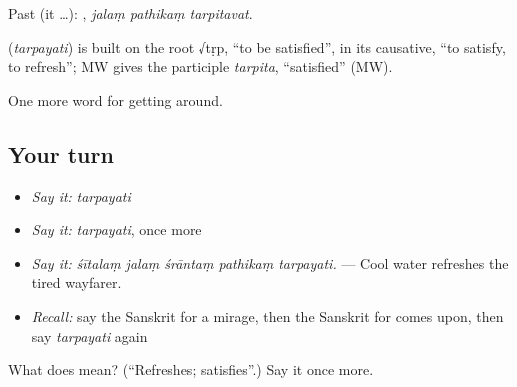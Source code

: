 Past (it …):   , \emph{jalaṃ pathikaṃ tarpitavat}.

\begin{cousinweb}
\textbf{} (\emph{tarpayati}) is built on the root √tṛp, \textquotedblleft{}to be satisfied\textquotedblright{}, in its causative, \textquotedblleft{}to satisfy, to refresh\textquotedblright{}; MW gives the participle \emph{tarpita}, \textquotedblleft{}satisfied\textquotedblright{} (MW).
\end{cousinweb}

\begin{grammarlens}[title={What you've built}]
One more word for getting around.
\end{grammarlens}

\subsection*{Your turn}
\begin{itemize}
\raggedright
  \item \emph{Say it:} \emph{tarpayati}
  \item \emph{Say it:} \emph{tarpayati}, once more
  \item \emph{Say it:} \emph{śītalaṃ jalaṃ śrāntaṃ pathikaṃ tarpayati.} — Cool water refreshes the tired wayfarer.
  \item \emph{Recall:} say the Sanskrit for a mirage, then the Sanskrit for comes upon, then say \emph{tarpayati} again
\end{itemize}

\begin{tcolorbox}[breakable,colback=teal!4,colframe=teal!35!black,title={Before you move on}]
What does  mean? (\textquotedblleft{}Refreshes; satisfies\textquotedblright{}.) Say it once more.
\end{tcolorbox}
